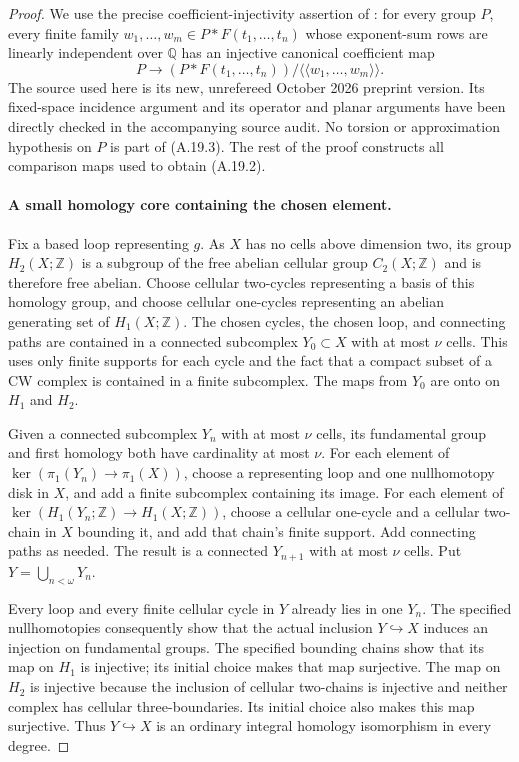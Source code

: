 \begin{proof}
We use the precise coefficient-injectivity assertion of
\cite[Theorem~1]{D_OpenAI2026Nonsingular}: for every group $P$,
every finite family $w_1,\ldots,w_m\in P*F(t_1,\ldots,t_n)$
whose exponent-sum rows are linearly independent over $\mathbb Q$
has an injective canonical coefficient map
\[
 P\longrightarrow
 (P*F(t_1,\ldots,t_n))/\langle\!\langle w_1,\ldots,w_m\rangle\!\rangle.
 \tag{A.19.3}
\]
The source used here is its new, unrefereed October 2026 preprint
version. Its fixed-space incidence argument and its operator and
planar arguments have been directly checked in the accompanying
source audit. No torsion or approximation hypothesis on $P$ is
part of (A.19.3). The rest of the proof constructs all comparison
maps used to obtain (A.19.2).

\paragraph{A small homology core containing the chosen element.}
Fix a based loop representing $g$. As $X$ has no cells above
dimension two, its group $H_2(X;\mathbb Z)$ is a subgroup of the
free abelian cellular group $C_2(X;\mathbb Z)$ and is therefore
free abelian. Choose cellular two-cycles representing a basis of
this homology group, and choose cellular one-cycles representing
an abelian generating set of $H_1(X;\mathbb Z)$. The chosen
cycles, the chosen loop, and connecting paths are contained in
a connected subcomplex $Y_0\subset X$ with at most $\nu$ cells.
This uses only finite supports for each cycle and the fact that
a compact subset of a CW complex is contained in a finite
subcomplex. The maps from $Y_0$ are onto on $H_1$ and $H_2$.

Given a connected subcomplex $Y_n$ with at most $\nu$ cells,
its fundamental group and first homology both have cardinality
at most $\nu$. For each element of
$\ker(\pi_1(Y_n)\to\pi_1(X))$, choose a representing loop and
one nullhomotopy disk in $X$, and add a finite subcomplex
containing its image. For each element of
$\ker(H_1(Y_n;\mathbb Z)\to H_1(X;\mathbb Z))$, choose a
cellular one-cycle and a cellular two-chain in $X$ bounding
it, and add that chain's finite support. Add connecting paths
as needed. The result is a connected $Y_{n+1}$ with at most
$\nu$ cells. Put $Y=\bigcup_{n<\omega}Y_n$.

Every loop and every finite cellular cycle in $Y$ already lies
in one $Y_n$. The specified nullhomotopies consequently show
that the actual inclusion $Y\hookrightarrow X$ induces an
injection on fundamental groups. The specified bounding chains
show that its map on $H_1$ is injective; its initial choice makes
that map surjective. The map on $H_2$ is injective because the
inclusion of cellular two-chains is injective and neither
complex has cellular three-boundaries. Its initial choice also
makes this map surjective. Thus $Y\hookrightarrow X$ is an
ordinary integral homology isomorphism in every degree.


\end{proof}
